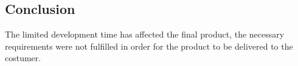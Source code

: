 
\subsection{Conclusion}
The limited development time has affected the final product, the necessary requirements were not fulfilled in order for the product to be delivered to the costumer.
